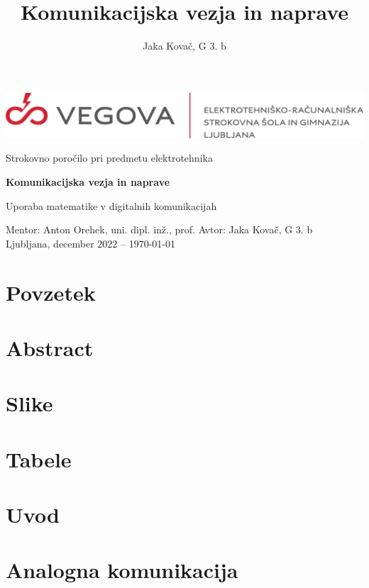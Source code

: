\documentclass[12pt]{article}
\title{Komunikacijska vezja in naprave}
\author{Jaka Kovač, G 3. b}
\begin{document}

\begin{center}
    \thispagestyle{empty}
    \includegraphics[scale=1]{slike/logotip_vegova_leze_brezokvirja.png}
    
    \vspace{\fill} 
    Strokovno poročilo pri predmetu elektrotehnika

    \Huge{\textbf{Komunikacijska vezja in naprave}}

    \normalsize
    Uporaba matematike v digitalnih komunikacijah
    \vspace{\fill}

    Mentor: Anton Orehek, uni. dipl. inž., prof. \hfill Avtor: Jaka Kovač, G 3. b\\
    \null
    Ljubljana, december 2022 – \MMYYYYdate\today
\end{center}
\newpage
\null
\newpage

\section*{Povzetek}
\section*{Abstract}

\newpage
\tableofcontents

\newpage
\begingroup
\makeatletter
\section*{Slike}
\let\clearpage\relax
\section*{Tabele}
\makeatother
\endgroup


\newpage
\section{Uvod}
\newpage
\section{Analogna komunikacija}
\end{document}
